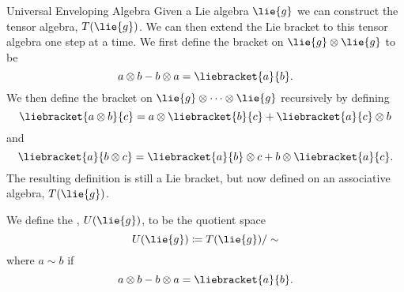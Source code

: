 \begin{dfn}{Universal Enveloping Algebra}{}
    Given a Lie algebra \(\lie{g}\) we can construct the tensor algebra, \(T(\lie{g})\).
    We can then extend the Lie bracket to this tensor algebra one step at a time.
    We first define the bracket on \(\lie{g}\otimes\lie{g}\) to be
    \begin{equation}
        a\otimes b - b\otimes a = \liebracket{a}{b}.
    \end{equation}
    We then define the bracket on \(\lie{g} \otimes \dotsb \otimes \lie{g}\) recursively by defining
    \begin{equation}
        \liebracket{a\otimes b}{c} = a\otimes\liebracket{b}{c} + \liebracket{a}{c}\otimes b
    \end{equation}
    and
    \begin{equation}
        \liebracket{a}{b\otimes c} = \liebracket{a}{b}\otimes c + b\otimes \liebracket{a}{c}.
    \end{equation}
    The resulting definition is still a Lie bracket, but now defined on an associative algebra, \(T(\lie{g})\).
    
    We define the , \(U(\lie{g})\), to be the quotient space
    \begin{equation}
        U(\lie{g}) \coloneqq T(\lie{g}) / \sim
    \end{equation}
    where \(a \sim b\) if
    \begin{equation}
        a\otimes b - b\otimes a = \liebracket{a}{b}.
    \end{equation}
\end{dfn}